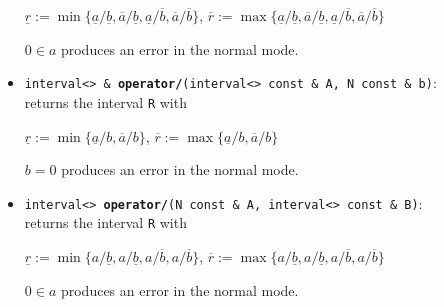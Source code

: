 \documentclass{report}
\begin{document}
\begin{itemize}
\begin{center}
				$\underline{r} := \min\{\underline{a}/\underline{b},\overline{a}/\underline{b},\underline{a}/\overline{b},\overline{a}/\overline{b}\}$,
				$\overline{r} := \max\{\underline{a}/\underline{b},\overline{a}/\underline{b},\underline{a}/\overline{b},\overline{a}/\overline{b}\}$
			\end{center}
			 $0\in a$ produces an error in the normal mode.
		\item
			\texttt{interval<> \& {\bf operator/}(interval<> const \& A, N const \& b)}:\\returns the interval \texttt{R} with
			\begin{center}
				$\underline{r} := \min\{\underline{a}/b,\overline{a}/b\}$,
				$\overline{r}  := \max\{\underline{a}/b,\overline{a}/b\}$
			\end{center}
			 $b = 0$ produces an error in the normal mode.
	\item
			\texttt{interval<> {\bf operator/}(N const \& A, interval<> const \& B)}:\\returns the interval \texttt{R} with
			\begin{center}
				$\underline{r} := \min\{{a}/\underline{b},{a}/\underline{b},{a}/\overline{b},{a}/\overline{b}\}$,
				$\overline{r} := \max\{{a}/\underline{b},{a}/\underline{b},{a}/\overline{b},{a}/\overline{b}\}$
			\end{center}
			 $0\in a$ produces an error in the normal mode.
\end{itemize}
\end{document}
